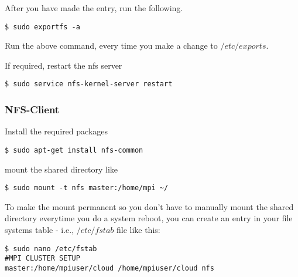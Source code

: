 \documentclass[paper=letter, fontsize=12pt]{article}
\begin{document}
After you have made the entry, run the following.

\begin{verbatim}
$ sudo exportfs -a
\end{verbatim}
Run the above command, every time you make a change to $ /etc/exports $.


If required, restart the nfs server
\begin{verbatim}
$ sudo service nfs-kernel-server restart
\end{verbatim}

\subsubsection{NFS-Client}
Install the required packages
\begin{verbatim}
$ sudo apt-get install nfs-common
\end{verbatim}

mount the shared directory like
\begin{verbatim}
$ sudo mount -t nfs master:/home/mpi ~/
\end{verbatim}

To make the mount permanent so you don’t have to manually mount the shared directory everytime you do a system reboot, you can create an entry in your file systems table - i.e., $ /etc/fstab $ file like this:
\begin{verbatim}
$ sudo nano /etc/fstab
#MPI CLUSTER SETUP
master:/home/mpiuser/cloud /home/mpiuser/cloud nfs
\end{verbatim}
\end{document}
